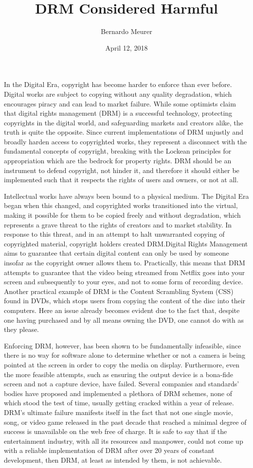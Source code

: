 \documentclass[12pt,letterpaper]{article}
\title{DRM Considered Harmful}
\author{Bernardo Meurer}
\date{April 12, 2018}
\begin{document}
\maketitle
\newpage
\doublespacing%
In the Digital Era, copyright has become harder to enforce than ever before. Digital works are subject to copying without any quality degradation, which encourages piracy and can lead to market failure.\autocite[\ppno~118]{favale-2014} While some optimists\autocite[\ppno~236]{goldstein-1996} claim that digital rights management (DRM) is a successful technology, protecting copyrights in the digital world, and safeguarding markets and creators alike, the truth is quite the opposite. Since current implementations of DRM unjustly and broadly harden access to copyrighted works, they represent a disconnect with the fundamental concepts of copyright, breaking with the Lockean principles for appropriation which are the bedrock for property rights. DRM should be an instrument to defend copyright, not hinder it, and therefore it should either be implemented such that it respects the rights of users and owners, or not at all.

Intellectual works have always been bound to a physical medium. The Digital Era began when this changed, and copyrighted works transitioned into the virtual, making it possible for them to be copied freely and without degradation, which represents a grave threat to the rights of creators and to market stability\autocite[\ppno~117]{favale-2014}. In response to this threat, and in an attempt to halt unwarranted copying of copyrighted material, copyright holders created DRM.\@ Digital Rights Management aims to guarantee that certain digital content can only be used by someone insofar as the copyright owner allows them to. Practically, this means that DRM attempts to guarantee that the video being streamed from Netflix goes into your screen and subsequently to your eyes, and not to some form of recording device. Another practical example of DRM is the Content Scrambling System (CSS) found in DVDs, which stops users from copying the content of the disc into their computers. Here an issue already becomes evident due to the fact that, despite one having purchased and by all means owning the DVD, one cannot do with as they please.

Enforcing DRM, however, has been shown to be fundamentally infeasible, since there is no way for software alone to determine whether or not a camera is being pointed at the screen in order to copy the media on display. Furthermore, even the more feasible attempts, such as ensuring the output device is a bona-fide screen and not a capture device, have failed. Several companies and standards' bodies have proposed and implemented a plethora of DRM schemes, none of which stood the test of time, usually getting cracked within a year of release. DRM's ultimate failure manifests itself in the fact that not one single movie, song, or video game released in the past decade that reached a minimal degree of success is unavailable on the web free of charge. It is safe to say that if the entertainment industry, with all its resources and manpower, could not come up with a reliable implementation of DRM after over 20 years of constant development, then DRM, at least as intended by them, is not achievable.
\end{document}
